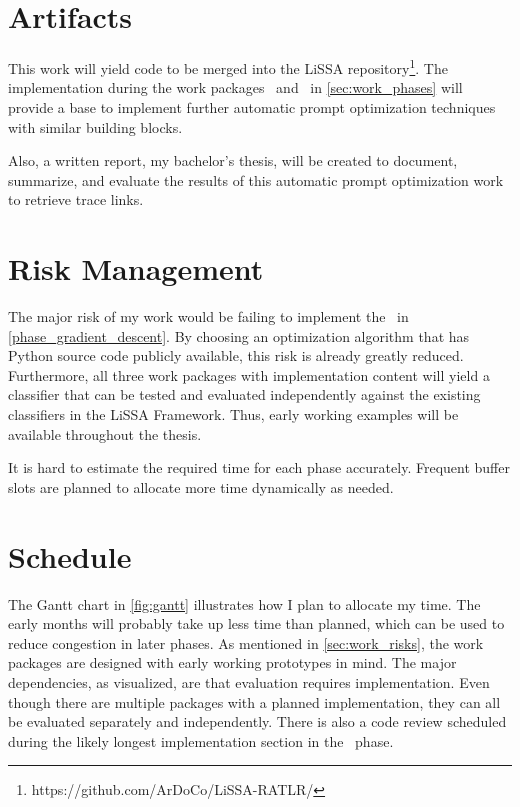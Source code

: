 \section{Artifacts}
\label{sec:work_artifacts}
This work will yield code to be merged into the LiSSA repository\footnote{https://github.com/ArDoCo/LiSSA-RATLR/}.
The implementation during the work packages~ and~ in \autoref{sec:work_phases} will provide a base to implement further automatic prompt optimization techniques with similar building blocks.

Also, a written report, my bachelor's thesis, will be created to document, summarize, and evaluate the results of this automatic prompt optimization work to retrieve trace links.


\section{Risk Management}
\label{sec:work_risks}
The major risk of my work would be failing to implement the~ in \autoref{phase_gradient_descent}.
By choosing an optimization algorithm that has Python source code publicly available, this risk is already greatly reduced.
Furthermore, all three work packages with implementation content will yield a classifier that can be tested and evaluated independently against the existing classifiers in the LiSSA Framework.
Thus, early working examples will be available throughout the thesis.

It is hard to estimate the required time for each phase accurately.
Frequent buffer slots are planned to allocate more time dynamically as needed.




\section{Schedule}
\label{sec:work_gant}
The Gantt chart in \autoref{fig:gantt} illustrates how I plan to allocate my time.
The early months will probably take up less time than planned, which can be used to reduce congestion in later phases.
As mentioned in \autoref{sec:work_risks}, the work packages are designed with early working prototypes in mind.
The major dependencies, as visualized, are that evaluation requires implementation. 
Even though there are multiple packages with a planned implementation, they can all be evaluated separately and independently.
There is also a code review scheduled during the likely longest implementation section in the~ phase.


